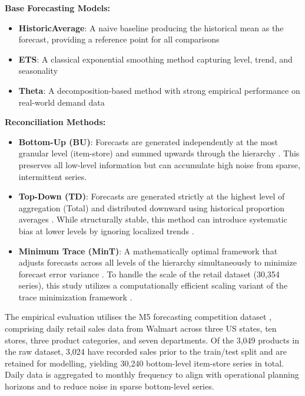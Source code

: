 \textbf{Base Forecasting Models:}
\begin{itemize}
	\item \textbf{HistoricAverage}: A naive baseline producing the historical mean as the forecast, providing a reference point for all comparisons
	\item \textbf{ETS}: A classical exponential smoothing method capturing level, trend, and seasonality \cite{Hyndman:2008}
	\item \textbf{Theta}: A decomposition-based method with strong empirical performance on real-world demand data \cite{Assimakopoulos:2000}
\end{itemize}

\textbf{Reconciliation Methods:}
\begin{itemize}
	\item \textbf{Bottom-Up (BU)}: Forecasts are generated independently at the most granular level (item-store) and summed upwards through the hierarchy \cite{Orcutt:1968, Dunn:1976}. This preserves all low-level information but can accumulate high noise from sparse, intermittent series.
	\item \textbf{Top-Down (TD)}: Forecasts are generated strictly at the highest level of aggregation (Total) and distributed downward using historical proportion averages \cite{Gross:1990}. While structurally stable, this method can introduce systematic bias at lower levels by ignoring localized trends \cite{Wickramasuriya:2019}.
	\item \textbf{Minimum Trace (MinT)}: A mathematically optimal framework that adjusts forecasts across all levels of the hierarchy simultaneously to minimize forecast error variance \cite{Wickramasuriya:2019}. To handle the scale of the retail dataset (30,354 series), this study utilizes a computationally efficient scaling variant of the trace minimization framework \cite{Wickramasuriya:2019}.
\end{itemize}

The empirical evaluation utilises the M5 forecasting competition dataset \cite{Makridakis:2022}, comprising daily retail sales data from Walmart across three US states, ten stores, three product categories, and seven departments. Of the 3,049 products in the raw dataset, 3,024 have recorded sales prior to the train/test split and are retained for modelling, yielding 30,240 bottom-level item-store series in total. Daily data is aggregated to monthly frequency to align with operational planning horizons and to reduce noise in sparse bottom-level series.

